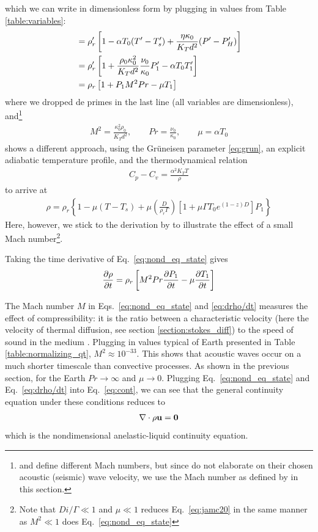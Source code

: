 \documentclass[a4paper]{article}
\begin{document}
which we can write in dimensionless form by plugging in values from Table \ref{table:variables}:
\begin{align}
    &=\rho'_r\left[1- \alpha T_0(T'-T'_s)+\frac{\eta \kappa_0}{K_Td^2}(P'-P'_H) \right] \notag \\
    &=\rho'_r\left[1+ \frac{\rho_0 \kappa_0^2}{K_T d^2}\frac{\nu_0}{\kappa_0}P'_1-\alpha T_0 T'_1\right] \notag\\ 
    &=\rho_r\left[1+P_1M^2Pr - \mu T_1\right] \label{eq:nond_eq_state}
\end{align}
where we dropped de primes in the last line (all variables are dimensionless), and\footnote{\textcite{jamc80} and \textcite{scto01} define different Mach numbers, 
but since \cite{jamc80} do not 
elaborate on their chosen acoustic (seismic) wave velocity, we use the Mach number as defined by \cite{scto01} in this section.}
\begin{align*}
    M^2 = \frac{\kappa_0^2\rho_0}{K_T d^2}, \qquad Pr = \frac{\nu_0}{\kappa_0}, \qquad \mu=\alpha T_0 
\end{align*}  
\textcite{jamc80} shows a different approach, using the Grüneisen parameter \eqref{eq:grun}, an explicit adiabatic temperature profile, and the thermodynamical relation 
\begin{align*}
    C_p - C_v = \frac{\alpha^2K_TT}{\rho}
\end{align*}
to arrive at 
\begin{align} \label{eq:jamc20}
    \rho = \rho_r\left\{1-\mu(T-T_s) + \mu\left(\frac{D}{\rho_r \Gamma}\right)[1+\mu\Gamma T_0e^{(1-z)D}]P_1\right\}
\end{align}
Here, however, we stick to the derivation by \textcite{scto01} to illustrate the effect of a small Mach number\footnote{Note that $\mathit{Di}/\Gamma \ll 1$ and $\mu \ll 1$ 
reduces Eq.~\eqref{eq:jamc20} in the same manner as $\mathit{M^2}\ll 1$ does Eq.~\eqref{eq:nond_eq_state}}.

Taking the time derivative of Eq.~\eqref{eq:nond_eq_state} gives 
\begin{align} \label{eq:drho/dt}
    \pdv{\rho}{t} = \rho_r\left[M^2Pr \pdv{P_1}{t} - \mu \pdv{T_1}{t}\right]
\end{align}

The Mach number $M$ in Eqs.~\eqref{eq:nond_eq_state} and \eqref{eq:drho/dt} measures the effect of compressibility: it is the ratio between a characteristic velocity (here 
the velocity of thermal diffusion, see section \ref{section:stokes_diff}) to the speed of sound in the medium \autocite{scto01,jamc80}. Plugging in values typical of Earth presented in Table \ref{table:normalizing_qt}, $M^2 \approx 10^{-33}$. This shows that acoustic waves occur on a much shorter timescale than convective processes. 
As shown in the previous section, for the Earth $\mathit{Pr} \to \infty$ and $\mu \to 0$. Plugging Eq.~\eqref{eq:nond_eq_state} and Eq.~\eqref{eq:drho/dt} into Eq.~\eqref{eq:cont}, we can see that the general continuity equation 
under these conditions reduces to
\begin{align} \label{eq:ALA_cont}
        \nabla \cdot \rho \bf{u} = 0
\end{align}
which is the nondimensional anelastic-liquid continuity equation. 
\end{document}
